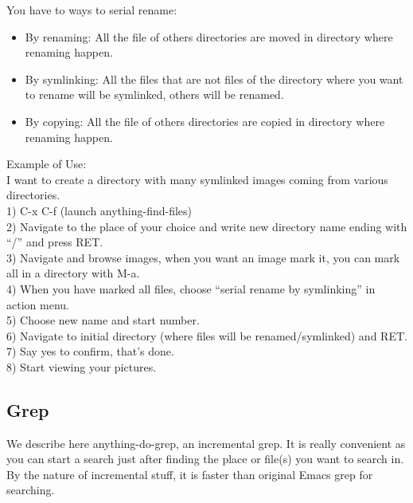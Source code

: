 \documentclass[a4paper,11pt]{article}
\begin{document}
You have to ways to serial rename:\\
\begin{itemize}
\item By renaming: All the file of others directories are moved in directory where renaming happen.\\ 
\end{itemize}
\begin{itemize}
\item By symlinking: All the files that are not files of the directory where you want to rename will be symlinked,
others will be renamed.\\
\end{itemize}
\begin{itemize}
\item By copying: All the file of others directories are copied in directory where renaming happen.\\ 
\end{itemize}

Example of Use:\\
I want to create a directory with many symlinked images coming from various directories.\\
1) C-x C-f (launch anything-find-files)\\
2) Navigate to the place of your choice and write new directory name ending with ``/'' and press RET.\\
3) Navigate and browse images, when you want an image mark it, you can mark all in a directory with M-a.\\
4) When you have marked all files, choose ``serial rename by symlinking'' in action menu.\\
5) Choose new name and start number.\\
6) Navigate to initial directory (where files will be renamed/symlinked) and RET.\\
7) Say yes to confirm, that's done.\\
8) Start viewing your pictures.\\

\subsection{Grep}
\label{sec:grep}
We describe here anything-do-grep, an incremental grep.
It is really convenient as you can start a search just after finding the place or file(s) you want to search in.
By the nature of incremental stuff, it is faster than original Emacs grep for searching.
\end{document}
